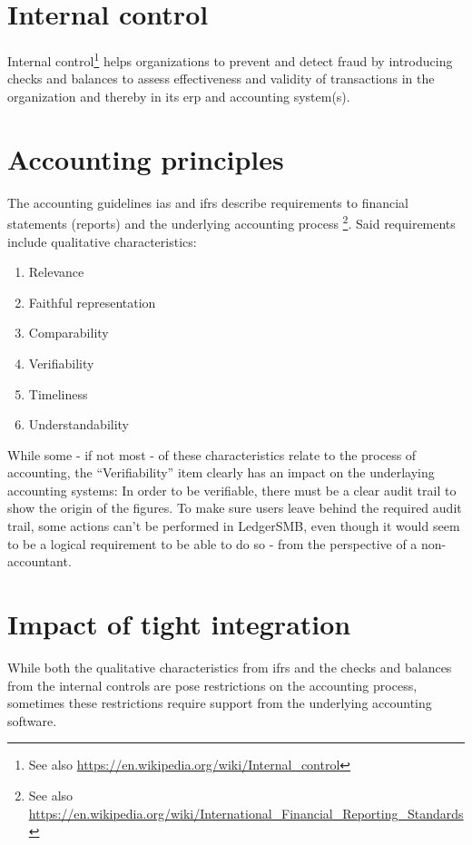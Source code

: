 \section{Internal control}
\label{sec-advocacy-internal-control}

Internal control\footnote{See also \url{https://en.wikipedia.org/wiki/Internal_control}}
helps organizations to prevent and detect fraud by introducing checks and balances
to assess effectiveness and validity of transactions in the organization and thereby
in its \gls{erp} and accounting system(s).

\section{Accounting principles}
\label{sec-system-accounting-principles}

The accounting guidelines \gls{ias} and \gls{ifrs} describe requirements
to financial statements (reports) and the underlying accounting process
\footnote{See also \url{https://en.wikipedia.org/wiki/International_Financial_Reporting_Standards}}.
Said requirements include qualitative characteristics:

\begin{enumerate}
\item Relevance
\item Faithful representation
\item Comparability
\item Verifiability
\item Timeliness
\item Understandability
\end{enumerate}

While some - if not most - of these characteristics relate to the process of accounting,
the ``Verifiability'' item clearly has an impact on the underlaying accounting systems:
In order to be verifiable, there must be a clear audit trail to show the origin of the
figures. To make sure users leave behind the required audit trail, some actions can't
be performed in LedgerSMB, even though it would seem to be a logical requirement to be
able to do so - from the perspective of a non-accountant.


\section{Impact of tight integration}
\label{sec-system-impact-of-tight-integration}

While both the qualitative characteristics from \gls{ifrs} and the checks and balances
from the internal controls are pose restrictions on the accounting process,
sometimes these restrictions require support from the underlying accounting
software.

